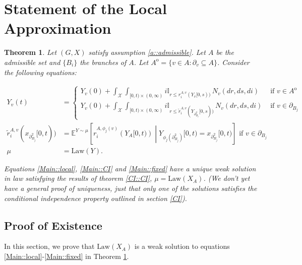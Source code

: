 \documentclass[12pt]{article}
\newcommand{\mb}{\mathbb}
\newcommand{\mc}{\mathcal}
\newcommand{\ov}{\overline}
\newcommand{\te}{\text}
\newcommand{\exmu}[2]{\mb{E}^{#1}\left[#2\right]}	%
\newcommand{\sta}{\mc{X}}							%
\newcommand{\neigh}[1]{\partial_{#1}}				%
\newcommand{\dneigh}[1]{\partial^2_{#1}}			%
\newcommand{\cl}[1]{\ov{#1}}						%
\newcommand{\Xf}{X}									%
\newcommand{\poiss}{N}								%
\newcommand{\rate}{r}								%
\newcommand{\poissv}[1]{_{#1}}						%
\newcommand{\vind}[1]{_{#1}}						%
\newcommand{\tme}[1]{(#1)}							%
\newcommand{\tmi}[1]{#1}							%
\newcommand{\stpara}[1]{_{#1}}						%
\newcommand{\gvpara}[2]{^{#1,#2}}					%
\newcommand{\Xg}{Y}
\newcommand{\inte}[1]{{#1}^\mathrm{o}}
\newcommand{\alt}[1]{\tilde{#1}}
\newcommand{\law}{\te{Law}}
\newtheorem{thms}{Theorem}[section]
\begin{document}
\section{Statement of the Local Approximation}
\label{Main}


\begin{thms}
Let \((G,\Xf)\) satisfy assumption \ref{a::admissible}. Let \(A\) be the admissible set and \(\{B_i\}\) the branches of \(A\). Let \(\inte{A} = \{v \in A: \neigh{v} \subseteq A\}\). Consider the following equations:

\begin{align}
\Xg\vind{v}\tme{t} &= 
\begin{cases}
\Xg\vind{v}\tme{0} + \int_{\sta} \int_{[0,t)\times (0,\infty)} i\mb{I}_{r\leq \rate\gvpara{A}{v}\stpara{i}(\Xg\vind{\cl{v}}\tmi{[0,s)})}\,\poiss\poissv{v}(dr,ds,di) & \te{ if } v \in \inte{A}\\
\Xg\vind{v}\tme{0} + \int_{\sta} \int_{[0,t)\times (0,\infty)} i\mb{I}_{r\leq \alt{\rate}\gvpara{A}{v}\stpara{i}(\Xg\vind{\dneigh{B_j}}\tmi{[0,s)})}\,\poiss\poissv{v}(dr,ds,di) &\te{ if } v \in \neigh{B_j}
\end{cases}\label{Main::local}\\
\alt{\rate}\gvpara{A}{v}\stpara{i}(x_{\dneigh{B_j}}[0,t)) &= \exmu{\Xg \sim \mu}{\rate\gvpara{A}{\phi_j(v)}\stpara{i}\left(\Xg\vind{A}\tmi{[0,t)}\right)\middle|\Xg\vind{\phi_j(\dneigh{B_j})}\tmi{[0,t)} = x\vind{\dneigh{B_j}}\tmi{[0,t)}} \te{ if } v \in \neigh{B_j}\label{Main::CI}\\
\mu &= \law(\Xg).\label{Main::fixed}
\end{align}

Equations \eqref{Main::local}, \eqref{Main::CI} and \eqref{Main::fixed} have a unique weak solution in law satisfying the results of theorem \ref{CI::CI}, \(\mu = \law(\Xf\vind{A})\). (We don't yet have a general proof of uniqueness, just that only one of the solutions satisfies the conditional independence property outlined in section \ref{CI}).
\label{Main::Main}
\end{thms}

\subsection{Proof of Existence}
\label{Ex::Main}

In this section, we prove that \(\law(\Xf\vind{A})\) is a weak solution to equations \eqref{Main::local}-\eqref{Main::fixed} in Theorem \ref{Main::Main}.
\end{document}
